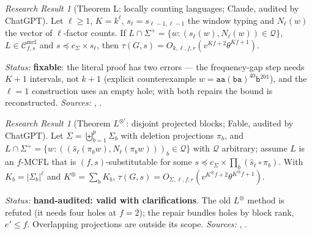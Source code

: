 \documentclass[11pt]{article}
\numberwithin{equation}{section}
\theoremstyle{plain}
\theoremstyle{definition}
\theoremstyle{remark}
\newtheorem{rresult}[theorem]{Research Result}
\newcommand{\Cmcf}[2]{\mathcal{C}^{\mathrm{mcf}}_{#1,#2}}
\theoremstyle{plain}
\begin{document}
\begin{rresult}[Theorem L: locally counting languages; Claude, audited by ChatGPT]
\label{rr:theorem-L}
Let $\ell\ge1$, $K=k^\ell$, $s_\ell=s_{\ell-1,\ell-1}$ the window typing and $N_\ell(w)$
the vector of $\ell$-factor counts.  If
$L\cap\Sigma^+=\{w:(s_\ell(w),N_\ell(w))\in\mathcal Q\}$, $L\in\Cmcf{f}{s}$ and
$s\preceq c_\Sigma\times s_\ell$, then $\tau(G,s)=O_{k,\ell,f,r}(v^{Kf+2}\theta^{Kf+1})$.
\end{rresult}
\noindent\emph{Status:} \textbf{fixable}: the literal proof has two errors --- the
frequency-gap step needs $K+1$ intervals, not $k+1$ (explicit counterexample
$w=\mathtt{aa}(\mathtt{ba})^{40}\mathtt b^{201}$), and the $\ell=1$ construction uses an empty
hole; with both repairs the bound is reconstructed.  \emph{Sources:}
, .

\begin{rresult}[Theorem $L^{\otimes\prime}$: disjoint projected blocks; Fable, audited by ChatGPT]
\label{rr:theorem-Ltensor}
Let $\Sigma=\biguplus_{b=1}^p\Sigma_b$ with deletion projections $\pi_b$, and
$L\cap\Sigma^+=\{w:((\widehat s_\ell(\pi_bw),N_\ell(\pi_bw)))_{b}\in\mathcal Q\}$ with
$\mathcal Q$ arbitrary; assume $L$ is an $f$-MCFL that is $(f,s)$-substitutable for
some $s\preceq c_\Sigma\times\prod_b(\widehat s_\ell\circ\pi_b)$.  With $K_b=|\Sigma_b|^\ell$
and $K^\otimes=\sum_bK_b$,
$\tau(G,s)=O_{\Sigma,\ell,f,r}(v^{K^\otimes f+2}\theta^{K^\otimes f+1})$.
\end{rresult}
\noindent\emph{Status:} \textbf{hand-audited: valid with clarifications}.  The old
$L^{\otimes}$ method is refuted (it needs four holes at $f=2$); the repair bundles holes
by block rank, $e'\le f$.  Overlapping projections are outside its scope.
\emph{Sources:} ,
.
\end{document}
